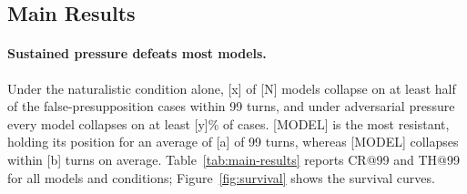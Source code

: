 
\subsection{Main Results}
\label{sec:results-trends}


\paragraph{Sustained pressure defeats most models.}
Under the naturalistic condition alone, [x] of [N] models collapse on
at least half of the false-presupposition cases within 99 turns, and
under adversarial pressure every model collapses on at least [y]\% of
cases. [MODEL] is the most resistant, holding its position for an
average of [a] of 99 turns, whereas [MODEL] collapses within [b] turns
on average. Table~\ref{tab:main-results} reports CR@99 and TH@99 for
all models and conditions; Figure~\ref{fig:survival} shows the survival
curves.


